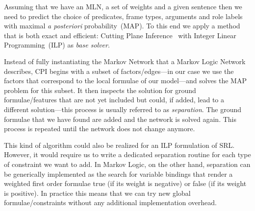 



Assuming that we have an MLN, a set of weights and a given sentence then we need to predict the choice of predicates, frame types, arguments and role labels with maximal \emph{a posteriori} probability~(MAP). To this end we apply a method that is both exact and efficient: Cutting Plane Inference~\cite[CPI,][]{riedel08improving} with Integer Linear Programming~(ILP) as \emph{base solver}. 

Instead of fully instantiating the Markov Network that a Markov Logic Network describes, CPI begins with a subset of factors/edges---in our case we use the factors that correspond to the local formulae of our model---and solves the MAP problem for this subset. It then inspects the solution for ground formulae/features that are not yet included but could, if added, lead to a different solution---this process is usually referred to as \emph{separation}. The ground formulae that we have found are added and the network is solved again. This process is repeated until the network does not change anymore.

This kind of algorithm could also be realized for an ILP formulation of SRL. However, it would require us to write a dedicated separation routine for each type of constraint we want to add. In Markov Logic, on the other hand, separation can be generically implemented as the search for variable bindings that render a weighted first order formulae true (if its weight is negative) or false (if its weight is positive). In practice this means that we can try new global formulae/constraints without any additional implementation overhead.   

